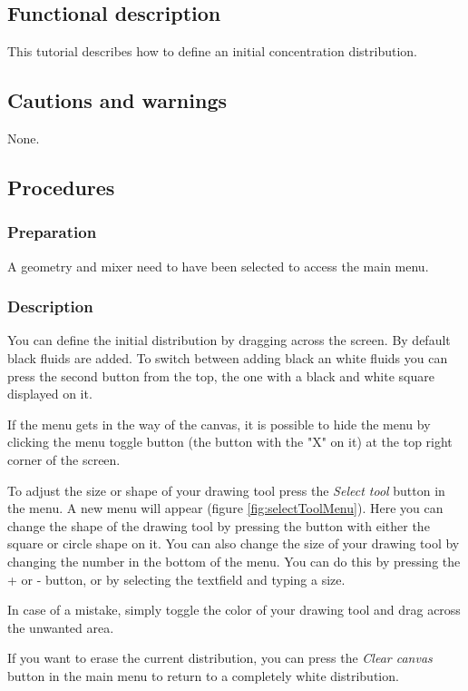 \subsection{Functional description}
This tutorial describes how to define an initial concentration distribution.

\subsection{Cautions and warnings}
None.

\subsection{Procedures}
\subsubsection{Preparation}
A geometry and mixer need to have been selected to access the main menu.

\subsubsection{Description}
You can define the initial distribution by dragging across the screen. By default black fluids are added. To switch between adding black an white fluids you can press the second button from the top, the one with a black and white square displayed on it.

If the menu gets in the way of the canvas, it is possible to hide the menu by clicking the menu toggle button (the button with the "X" on it) at the top right corner of the screen.

 To adjust the size or shape of your drawing tool press the \emph{Select tool} button in the menu. A new menu will appear (figure \ref{fig:selectToolMenu}). Here you can change the shape of the drawing tool by pressing the button with either the square or circle shape on it. You can also change the size of your drawing tool by changing the number in the bottom of the menu. You can do this by pressing the + or - button, or by selecting the textfield and typing a size.


In case of a mistake, simply toggle the color of your drawing tool and drag across the unwanted area.

If you want to erase the current distribution, you can press the \emph{Clear canvas} button in the main menu to return to a completely white distribution.

